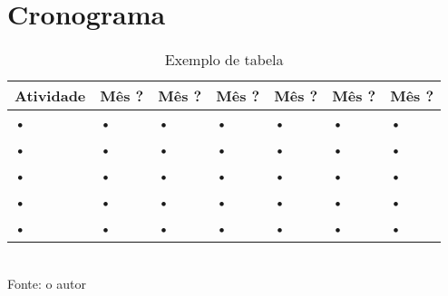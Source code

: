 \section{Cronograma}

\begin{table}[htbp]
\centering
\caption{Exemplo de tabela}
\label{tab:exTabela}
\begin{tabular}{|l|l|l|l|l|l|l|}
\hline
Atividade & Mês ? & Mês ? & Mês ? & Mês ? & Mês ? & Mês ? \\ 
\hline
• & • & • & • & • & • & • \\
\hline
• & • & • & • & • & • & • \\
\hline
• & • & • & • & • & • & • \\
\hline
• & • & • & • & • & • & • \\
\hline
• & • & • & • & • & • & • \\
\hline
\end{tabular}
\\ \footnotesize Fonte: o autor
\end{table}
